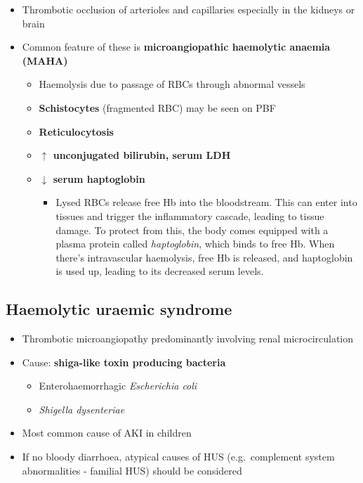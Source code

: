 \documentclass[
  12pt,
]{memoir}
\providecommand{\tightlist}{%
  \setlength{\itemsep}{0pt}\setlength{\parskip}{0pt}}
\begin{document}
\begin{itemize}
\tightlist
\item
  Thrombotic occlusion of arterioles and capillaries especially in the
  kidneys or brain
\item
  Common feature of these is \textbf{microangiopathic haemolytic anaemia
  (MAHA)}

  \begin{itemize}
  \tightlist
  \item
    Haemolysis due to passage of RBCs through abnormal vessels
  \item
    \textbf{Schistocytes} (fragmented RBC) may be seen on PBF
  \item
    \textbf{Reticulocytosis}
  \item
    \textbf{\(\uparrow\) unconjugated bilirubin, serum LDH}
  \item
    \textbf{\(\downarrow\) serum haptoglobin}

    \begin{itemize}
    \tightlist
    \item
      Lysed RBCs release free Hb into the bloodstream. This can enter
      into tissues and trigger the inflammatory cascade, leading to
      tissue damage. To protect from this, the body comes equipped with
      a plasma protein called \emph{haptoglobin}, which binds to free
      Hb. When there's intravascular haemolysis, free Hb is released,
      and haptoglobin is used up, leading to its decreased serum levels.
    \end{itemize}
  \end{itemize}
\end{itemize}

\hypertarget{haemolytic-uraemic-syndrome}{%
\subsection{Haemolytic uraemic
syndrome}\label{haemolytic-uraemic-syndrome}}

\begin{itemize}
\tightlist
\item
  Thrombotic microangiopathy predominantly involving renal
  microcirculation
\item
  Cause: \textbf{shiga-like toxin producing bacteria}

  \begin{itemize}
  \tightlist
  \item
    Enterohaemorrhagic \emph{Escherichia coli}
  \item
    \emph{Shigella dysenteriae}
  \end{itemize}
\item
  Most common cause of AKI in children
\item
  If no bloody diarrhoea, atypical causes of HUS (e.g.~complement system
  abnormalities - familial HUS) should be considered
\end{itemize}
\end{document}
